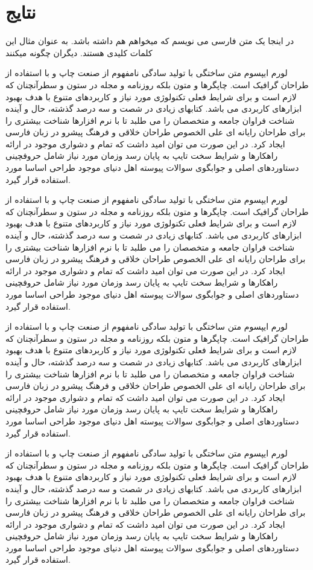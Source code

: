 \chapter{نتایج}
\clearpage
در اینجا یک متن فارسی می نویسم که میخواهم  هم داشته باشد.
به عنوان مثال این  کلمات کلیدی هستند.
دیگران چگونه  میکنند

لورم ایپسوم متن ساختگی با تولید سادگی نامفهوم از صنعت چاپ و با استفاده از طراحان گرافیک است. چاپگرها و متون بلکه روزنامه و مجله در ستون و سطرآنچنان که لازم است و برای شرایط فعلی تکنولوژی مورد نیاز و کاربردهای متنوع با هدف بهبود ابزارهای کاربردی می باشد. کتابهای زیادی در شصت و سه درصد گذشته، حال و آینده شناخت فراوان جامعه و متخصصان را می طلبد تا با نرم افزارها شناخت بیشتری را برای طراحان رایانه ای علی الخصوص طراحان خلاقی و فرهنگ پیشرو در زبان فارسی ایجاد کرد. در این صورت می توان امید داشت که تمام و دشواری موجود در ارائه راهکارها و شرایط سخت تایپ به پایان رسد وزمان مورد نیاز شامل حروفچینی دستاوردهای اصلی و جوابگوی سوالات پیوسته اهل دنیای موجود طراحی اساسا مورد استفاده قرار گیرد.

لورم ایپسوم متن ساختگی با تولید سادگی نامفهوم از صنعت چاپ و با استفاده از طراحان گرافیک است. چاپگرها و متون بلکه روزنامه و مجله در ستون و سطرآنچنان که لازم است و برای شرایط فعلی تکنولوژی مورد نیاز و کاربردهای متنوع با هدف بهبود ابزارهای کاربردی می باشد. کتابهای زیادی در شصت و سه درصد گذشته، حال و آینده شناخت فراوان جامعه و متخصصان را می طلبد تا با نرم افزارها شناخت بیشتری را برای طراحان رایانه ای علی الخصوص طراحان خلاقی و فرهنگ پیشرو در زبان فارسی ایجاد کرد. در این صورت می توان امید داشت که تمام و دشواری موجود در ارائه راهکارها و شرایط سخت تایپ به پایان رسد وزمان مورد نیاز شامل حروفچینی دستاوردهای اصلی و جوابگوی سوالات پیوسته اهل دنیای موجود طراحی اساسا مورد استفاده قرار گیرد.

لورم ایپسوم متن ساختگی با تولید سادگی نامفهوم از صنعت چاپ و با استفاده از طراحان گرافیک است. چاپگرها و متون بلکه روزنامه و مجله در ستون و سطرآنچنان که لازم است و برای شرایط فعلی تکنولوژی مورد نیاز و کاربردهای متنوع با هدف بهبود ابزارهای کاربردی می باشد. کتابهای زیادی در شصت و سه درصد گذشته، حال و آینده شناخت فراوان جامعه و متخصصان را می طلبد تا با نرم افزارها شناخت بیشتری را برای طراحان رایانه ای علی الخصوص طراحان خلاقی و فرهنگ پیشرو در زبان فارسی ایجاد کرد. در این صورت می توان امید داشت که تمام و دشواری موجود در ارائه راهکارها و شرایط سخت تایپ به پایان رسد وزمان مورد نیاز شامل حروفچینی دستاوردهای اصلی و جوابگوی سوالات پیوسته اهل دنیای موجود طراحی اساسا مورد استفاده قرار گیرد.

لورم ایپسوم متن ساختگی با تولید سادگی نامفهوم از صنعت چاپ و با استفاده از طراحان گرافیک است. چاپگرها و متون بلکه روزنامه و مجله در ستون و سطرآنچنان که لازم است و برای شرایط فعلی تکنولوژی مورد نیاز و کاربردهای متنوع با هدف بهبود ابزارهای کاربردی می باشد. کتابهای زیادی در شصت و سه درصد گذشته، حال و آینده شناخت فراوان جامعه و متخصصان را می طلبد تا با نرم افزارها شناخت بیشتری را برای طراحان رایانه ای علی الخصوص طراحان خلاقی و فرهنگ پیشرو در زبان فارسی ایجاد کرد. در این صورت می توان امید داشت که تمام و دشواری موجود در ارائه راهکارها و شرایط سخت تایپ به پایان رسد وزمان مورد نیاز شامل حروفچینی دستاوردهای اصلی و جوابگوی سوالات پیوسته اهل دنیای موجود طراحی اساسا مورد استفاده قرار گیرد.

